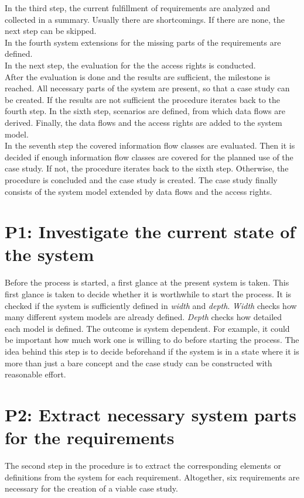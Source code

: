 In the third step, the current fulfillment of requirements are analyzed and collected in a summary. Usually there are shortcomings. If there are none, the next step can be skipped.\\  
In the fourth system extensions for the missing parts of the requirements are defined. \\
%
In the next step, the evaluation for the the access rights is conducted.\\
After the evaluation is done and the results are sufficient, the milestone is reached. All necessary parts of the system are present, so that a case study can be created. If the results are not sufficient the procedure iterates back to the fourth step. %
In the sixth step, scenarios are defined, from which data flows are derived. Finally, the data flows and the access rights are added to the system model.\\
In the seventh step the covered information flow classes are evaluated. Then it is decided if enough information flow classes are covered for the planned use of the case study. If not, the procedure iterates back to the sixth step. Otherwise, the procedure is concluded and the case study is created. The case study finally consists of the system model extended by data flows and the access rights.
\section{P1: Investigate the current state of the system}
Before the process is started, a first glance at the present system is taken. This first glance is taken to decide whether it is worthwhile to start the process. It is checked if the system is sufficiently defined in \textit{width} and \textit{depth}. \textit{Width} checks how many different system models are already defined. \textit{Depth} checks how detailed each model is defined. The outcome is system dependent. For example, it could be important how much work one is willing to do before starting the process. The idea behind this step is to decide beforehand if the system is in a state where it is more than just a bare concept and the case study can be constructed with reasonable effort.
\section{P2: Extract necessary system parts for the requirements}
\label{cs_req}
The second step in the procedure is to extract the corresponding elements or definitions from the system for each requirement. Altogether, six requirements are necessary for the creation of a viable case study.
